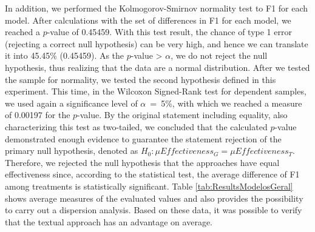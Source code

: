 In addition, we performed the Kolmogorov-Smirnov normality test to F1 for each model. 
After calculations with the set of differences in F1 for each model, we reached a $p$-value of 0.45459.
With this test result, the chance of type 1 error (rejecting a correct null hypothesis) can be very high, and hence we can translate it into 45.45\% (0.45459).
As the $p$-value > $\alpha$, we do not reject the null hypothesis, thus realizing that the data are a normal distribution.
After we tested the sample for normality, we tested the second hypothesis defined in this experiment.
This time, in the Wilcoxon Signed-Rank test for dependent samples, we used again a significance level of $\alpha$~=~5\%, with which we reached a measure of 0.00197 for the $p$-value.
By the original statement including equality, also characterizing this test as two-tailed, we concluded that the calculated $p$-value demonstrated enough evidence to guarantee the statement rejection of the primary null hypothesis, denoted as $H_0: \mu Effectiveness_G = \mu Effectiveness_T$.
Therefore, we rejected the null hypothesis that the approaches have equal effectiveness since, according to the statistical test, the average difference of F1 among treatments is statistically significant.
Table \ref{tab:ResultsModelosGeral} shows average measures of the evaluated values and also provides the possibility to carry out a dispersion analysis.
Based on these data, it was possible to verify that the textual approach has an advantage on average.

